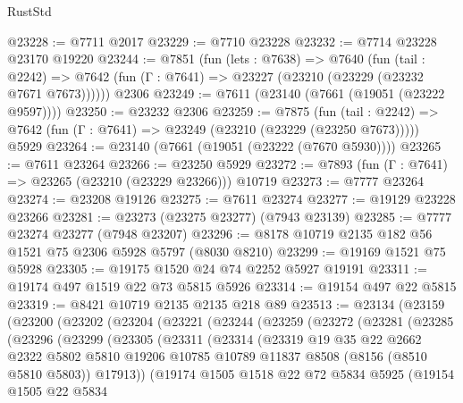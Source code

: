 \begin{lexlean}{RustStd}
\begin{coremodule}
{\begin{coremodule}
{{{{{{{{{{{{{{{{{{{{{{{{{{{{{{{{{{@23228 := @7711 @2017
@23229 := @7710 @23228
@23232 := @7714 @23228 @23170 @19220
@23244 := @7851
    (fun (lets : @7638) =>
    @7640
      (fun (tail : @2242) =>
      @7642 (fun (Γ : @7641) => @23227 (@23210 (@23229 (@23232 @7671 @7673))))))
    @2306
@23249 := @7611 (@23140 (@7661 (@19051 (@23222 @9597))))
@23250 := @23232 @2306
@23259 := @7875
    (fun (tail : @2242) => @7642 (fun (Γ : @7641) => @23249 (@23210 (@23229 (@23250 @7673)))))
    @5929
@23264 := @23140 (@7661 (@19051 (@23222 (@7670 @5930))))
@23265 := @7611 @23264
@23266 := @23250 @5929
@23272 := @7893 (fun (Γ : @7641) => @23265 (@23210 (@23229 @23266))) @10719
@23273 := @7777 @23264
@23274 := @23208 @19126
@23275 := @7611 @23274
@23277 := @19129 @23228 @23266
@23281 := @23273 (@23275 @23277) (@7943 @23139)
@23285 := @7777 @23274 @23277 (@7948 @23207)
@23296 := @8178 @10719 @2135 @182 @56 @1521 @75 @2306 @5928 @5797 (@8030 @8210)
@23299 := @19169 @1521 @75 @5928
@23305 := @19175 @1520 @24 @74 @2252 @5927 @19191
@23311 := @19174 @497 @1519 @22 @73 @5815 @5926
@23314 := @19154 @497 @22 @5815
@23319 := @8421 @10719 @2135 @2135 @218 @89
@23513 := @23134
    (@23159
      (@23200
        (@23202
          (@23204
            (@23221
              (@23244
                (@23259
                  (@23272
                    (@23281
                      (@23285
                        (@23296
                          (@23299
                            (@23305
                              (@23311
                                (@23314
                                  (@23319
                                    @19
                                    @35
                                    @22
                                    @2662
                                    @2322
                                    @5802
                                    @5810
                                    @19206
                                    @10785
                                    @10789
                                    @11837
                                    @8508
                                    (@8156 (@8510 @5810 @5803))
                                    @17913))
                                (@19174
                                  @1505
                                  @1518
                                  @22
                                  @72
                                  @5834
                                  @5925
                                  (@19154
                                    @1505
                                    @22
                                    @5834
}}}}}}}}}}}}}}}}}}}}}}}}}}}}}}}}}}
\end{coremodule}}
\end{coremodule}
\end{lexlean}
